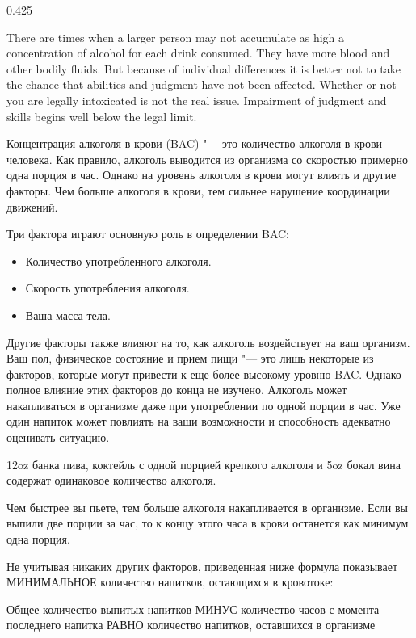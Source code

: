 \begin{langblock}{0.425}
\begin{eng}
	There are times when a larger person may not accumulate as high a concentration of alcohol for each drink consumed. They have more blood and other bodily fluids. But because of individual differences it is better not to take the chance that abilities and judgment have not been affected. Whether or not you are legally intoxicated is not the real issue. Impairment of judgment and skills begins well below the legal limit.
	\end{eng}
	\begin{rus}
		
		Концентрация алкоголя в крови (BAC) "--- это количество алкоголя в крови человека. Как правило, алкоголь выводится из организма со скоростью примерно одна порция в час. Однако на уровень алкоголя в крови могут влиять и другие факторы. Чем больше алкоголя в крови, тем сильнее нарушение координации движений.
		
		Три фактора играют основную роль в определении BAC:
		
		
		\begin{itemize}[noitemsep]
			\item Количество употребленного алкоголя.
			\item Скорость употребления алкоголя.
			\item Ваша масса тела.
		\end{itemize}
		
		Другие факторы также влияют на то, как алкоголь воздействует на ваш организм. Ваш пол, физическое состояние и прием пищи "--- это лишь некоторые из факторов, которые могут привести к еще более высокому уровню BAC. Однако полное влияние этих факторов до конца не изучено. Алкоголь может накапливаться в организме даже при употреблении по одной порции в час. Уже один напиток может повлиять на ваши возможности и способность адекватно оценивать ситуацию.
		
		12oz банка пива, коктейль с одной порцией крепкого алкоголя и 5oz бокал вина содержат одинаковое количество алкоголя.
		
		Чем быстрее вы пьете, тем больше алкоголя накапливается в организме. Если вы выпили две порции за час, то к концу этого часа в крови останется как минимум одна порция.
		
		Не учитывая никаких других факторов, приведенная ниже формула показывает МИНИМАЛЬНОЕ количество напитков, остающихся в кровотоке:
		
		Общее количество выпитых напитков МИНУС количество часов с момента последнего напитка РАВНО количество напитков, оставшихся в организме
		

\end{rus}
\end{langblock}

